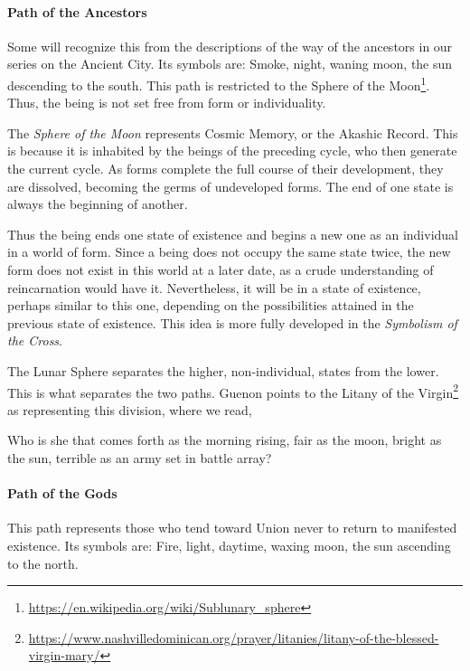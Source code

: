 \paragraph{Path of the Ancestors}
Some will recognize this from the descriptions of the way of the ancestors in our series on the Ancient City. Its symbols are: Smoke, night, waning moon, the sun descending to the south. This path is restricted to the Sphere of the Moon\footnote{\url{https://en.wikipedia.org/wiki/Sublunary_sphere}}. Thus, the being is not set free from form or individuality.

The \emph{Sphere of the Moon} represents Cosmic Memory, or the Akashic Record. This is because it is inhabited by the beings of the preceding cycle, who then generate the current cycle. As forms complete the full course of their development, they are dissolved, becoming the germs of undeveloped forms. The end of one state is always the beginning of another.

Thus the being ends one state of existence and begins a new one as an individual in a world of form. Since a being does not occupy the same state twice, the new form does not exist in this world at a later date, as a crude understanding of reincarnation would have it. Nevertheless, it will be in a state of existence, perhaps similar to this one, depending on the possibilities attained in the previous state of existence. This idea is more fully developed in the \emph{Symbolism of the Cross}.

The Lunar Sphere separates the higher, non-individual, states from the lower. This is what separates the two paths. Guenon points to the Litany of the Virgin\footnote{\url{https://www.nashvilledominican.org/prayer/litanies/litany-of-the-blessed-virgin-mary/}} as representing this division, where we read,

\begin{quotex}
Who is she that comes forth as the morning rising, fair as the moon, bright as the sun, terrible as an army set in battle array? 

\end{quotex}
\paragraph{Path of the Gods}
This path represents those who tend toward Union never to return to manifested existence. Its symbols are: Fire, light, daytime, waxing moon, the sun ascending to the north.

